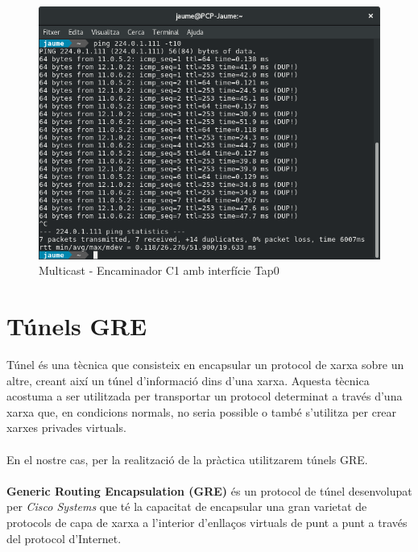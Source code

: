 \documentclass[10pt]{article}
\begin{document}
\begin{figure}[H]
\begin{center}
\includegraphics[scale=0.5]{Images/1aPartTap.png}
\caption{Multicast - Encaminador C1 amb interfície Tap0}
\end{center}
\end{figure}
\newpage
\section{Túnels GRE}
Túnel és una tècnica que consisteix en encapsular un protocol de xarxa sobre un altre, creant així un túnel d'informació dins d'una xarxa.  Aquesta tècnica acostuma a ser utilitzada per transportar un protocol determinat a través d'una xarxa que, en condicions normals, no seria possible o també s'utilitza per crear xarxes privades virtuals.\\\\
En el nostre cas, per la realització de la pràctica utilitzarem túnels GRE.
\\\\
\textbf{Generic Routing Encapsulation (GRE)} és un protocol de túnel desenvolupat per \textit{Cisco Systems} que té la capacitat de encapsular una gran varietat de protocols de capa de xarxa a l'interior d'enllaços virtuals de punt a punt a través del protocol d'Internet.
\end{document}
